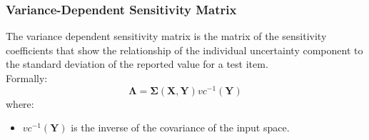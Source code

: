 \subsubsection{Variance-Dependent Sensitivity Matrix}
The variance dependent sensitivity matrix is the matrix of the sensitivity 
coefficients that show the relationship of the individual uncertainty 
component to the standard deviation of the reported value for a test 
item. 
\\ Formally:
\begin{equation}
\boldsymbol{\Lambda}= \boldsymbol{\Sigma}(\boldsymbol{X},\boldsymbol{Y})  vc^{-1}(\boldsymbol{Y})
\end{equation}
where:
\begin{itemize}
  \item $vc^{-1}(\boldsymbol{Y})$ is the inverse of the covariance of the 
  input space.
\end{itemize}

